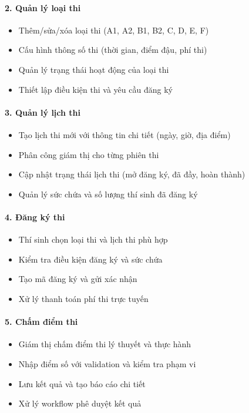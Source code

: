 \documentclass[12pt,a4paper]{article}
\begin{document}
\paragraph{2. Quản lý loại thi}
\begin{itemize}
    \item Thêm/sửa/xóa loại thi (A1, A2, B1, B2, C, D, E, F)
    \item Cấu hình thông số thi (thời gian, điểm đậu, phí thi)
    \item Quản lý trạng thái hoạt động của loại thi
    \item Thiết lập điều kiện thi và yêu cầu đăng ký
\end{itemize}

\paragraph{3. Quản lý lịch thi}
\begin{itemize}
    \item Tạo lịch thi mới với thông tin chi tiết (ngày, giờ, địa điểm)
    \item Phân công giám thị cho từng phiên thi
    \item Cập nhật trạng thái lịch thi (mở đăng ký, đã đầy, hoàn thành)
    \item Quản lý sức chứa và số lượng thí sinh đã đăng ký
\end{itemize}

\paragraph{4. Đăng ký thi}
\begin{itemize}
    \item Thí sinh chọn loại thi và lịch thi phù hợp
    \item Kiểm tra điều kiện đăng ký và sức chứa
    \item Tạo mã đăng ký và gửi xác nhận
    \item Xử lý thanh toán phí thi trực tuyến
\end{itemize}

\paragraph{5. Chấm điểm thi}
\begin{itemize}
    \item Giám thị chấm điểm thi lý thuyết và thực hành
    \item Nhập điểm số với validation và kiểm tra phạm vi
    \item Lưu kết quả và tạo báo cáo chi tiết
    \item Xử lý workflow phê duyệt kết quả
\end{itemize}
\end{document}
